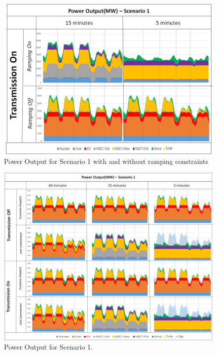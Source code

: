 \documentclass[12pt,LUDisStyle,twosided]{book}
\begin{document}
\begin{figure}[h] 
	\begin{center}
		\includegraphics[width=\textwidth,keepaspectratio]{PowerOutputScenario1_NR.png}
	  	\caption{Power Output for Scenario 1 with and without ramping constraints}
     	\label{fig:noRampingConstraint}
	\end{center}
\end{figure}

\begin{figure} 
  \centering
  
	  \includegraphics[width=\textwidth,height=\textheight,keepaspectratio]{PowerOutputScenario1.png}
  
  \caption{Power Output for Scenario 1.}
  \label{fig:powerOutputScenario1}
\end{figure}
\end{document}
